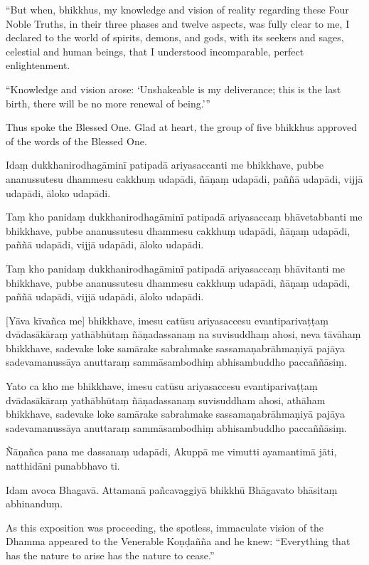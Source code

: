 ``But when, bhikkhus, my knowledge and vision of reality regarding these
Four Noble Truths, in their three phases and twelve aspects, was fully
clear to me, I declared to the world of spirits, demons, and gods, with
its seekers and sages, celestial and human beings, that I understood
incomparable, perfect enlightenment.

``Knowledge and vision arose: `Unshakeable is my deliverance; this is
the last birth, there will be no more renewal of being.'\thinspace ''

Thus spoke the Blessed One. Glad at heart, the group of five bhikkhus
approved of the words of the Blessed One.

\clearpage

\paliText

Idaṃ dukkhanirodhagāminī patipadā ariyasaccanti me bhikkhave, pubbe
ananussutesu dhammesu cakkhuṃ udapādi, ñāṇaṃ udapādi, paññā udapādi,
vijjā udapādi, āloko udapādi.

Taṃ kho panidaṃ dukkhanirodhagāminī patipadā ariyasaccaṃ bhāvetabbanti
me bhikkhave, pubbe ananussutesu dhammesu cakkhuṃ udapādi, ñāṇaṃ
udapādi, paññā udapādi, vijjā udapādi, āloko udapādi.

Taṃ kho panidaṃ dukkhanirodhagāminī patipadā ariyasaccaṃ bhāvitanti me
bhikkhave, pubbe ananussutesu dhammesu cakkhuṃ udapādi, ñāṇaṃ udapādi,
paññā udapādi, vijjā udapādi, āloko udapādi.

[Yāva kīvañca me] bhikkhave, imesu catūsu ariyasaccesu evantiparivaṭṭaṃ
dvādasākāraṃ yathābhūtaṃ ñāṇadassanaṃ na suvisuddhaṃ ahosi, neva tāvāhaṃ
bhikkhave, sadevake loke samārake sabrahmake sassamaṇabrāhmaṇiyā pajāya
sadevamanussāya anuttaraṃ sammāsambodhiṃ abhisambuddho paccaññāsiṃ.

Yato ca kho me bhikkhave, imesu catūsu ariyasaccesu evantiparivaṭṭaṃ
dvādasākāraṃ yathābhūtaṃ ñāṇadassanaṃ suvisuddham ahosi, athāham
bhikkhave, sadevake loke samārake sabrahmake sassamaṇabrāhmaṇiyā pajāya
sadevamanussāya anuttaraṃ sammāsambodhiṃ abhisambuddho paccaññāsiṃ.

Ñāṇañca pana me dassanaṃ udapādi, Akuppā me vimutti ayamantimā jāti,
natthidāni punabbhavo ti.

Idam avoca Bhagavā. Attamanā pañcavaggiyā bhikkhū Bhāgavato bhāsitaṃ
abhinanduṃ.

\clearpage

\englishText

As this exposition was proceeding, the spotless, immaculate vision of
the Dhamma appeared to the Venerable Koṇḍañña and he knew: ``Everything
that has the nature to arise has the nature to cease.''

